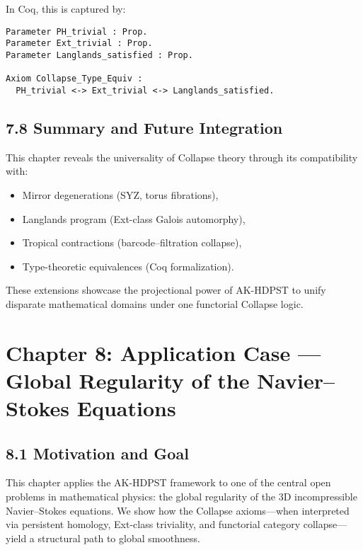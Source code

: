 \documentclass[11pt]{article}
\begin{document}
In Coq, this is captured by:

\begin{lstlisting}[language=Coq]
Parameter PH_trivial : Prop.
Parameter Ext_trivial : Prop.
Parameter Langlands_satisfied : Prop.

Axiom Collapse_Type_Equiv :
  PH_trivial <-> Ext_trivial <-> Langlands_satisfied.
\end{lstlisting}

\subsection*{7.8 Summary and Future Integration}

This chapter reveals the universality of Collapse theory through its compatibility with:
\begin{itemize}
  \item Mirror degenerations (SYZ, torus fibrations),
  \item Langlands program (Ext-class Galois automorphy),
  \item Tropical contractions (barcode–filtration collapse),
  \item Type-theoretic equivalences (Coq formalization).
\end{itemize}

These extensions showcase the projectional power of AK-HDPST to unify disparate mathematical domains under one functorial Collapse logic.



\section*{Chapter 8: Application Case — Global Regularity of the Navier–Stokes Equations}

\subsection*{8.1 Motivation and Goal}

This chapter applies the AK-HDPST framework to one of the central open problems in mathematical physics:  
the global regularity of the 3D incompressible Navier–Stokes equations.  
We show how the Collapse axioms—when interpreted via persistent homology, Ext-class triviality,  
and functorial category collapse—yield a structural path to global smoothness.
\end{document}
